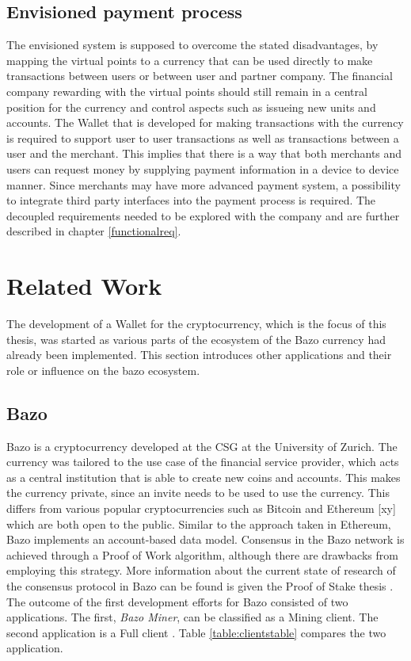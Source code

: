 \subsection{Envisioned payment process}
The envisioned system is supposed to overcome the stated disadvantages, by mapping the virtual points to a currency that can be used directly to make transactions between users or between user and partner company.
The financial company rewarding with the virtual points should still remain in a central position for the currency and control aspects such as issueing new units and accounts.
The Wallet that is developed for making transactions with the currency is required to support user to user transactions as well as transactions between a user and the merchant. This implies that there is a way that both merchants and users can request money by supplying payment information in a device to device manner. Since merchants may have more advanced payment system, a possibility to integrate third party interfaces into the payment process is required. The decoupled requirements needed to be explored with the company and are further described in chapter \ref{functionalreq}.


\section{Related Work}
The development of a Wallet for the cryptocurrency, which is the focus of this thesis, was started as various parts of the ecosystem of the Bazo currency had already been implemented. This section introduces other applications and their role or influence on the bazo ecosystem.
\subsection{Bazo}
Bazo is a cryptocurrency developed at the CSG at the University of Zurich. The currency was tailored to the use case of the financial service provider, which acts as a central institution that is able to create new coins and accounts. This makes the currency private, since an invite needs to be used to use the currency. This differs from various popular cryptocurrencies such as Bitcoin and Ethereum [xy] which are both open to the public. Similar to the approach taken in Ethereum, Bazo implements an account-based data model. Consensus in the Bazo network is achieved through a Proof of Work algorithm, although there are drawbacks from employing this strategy. More information about the current state of research of the consensus protocol in Bazo can be found is given the Proof of Stake thesis \cite{proofofstake}.
The outcome of the first development efforts for Bazo consisted of two applications. The first, \textit{Bazo Miner}, can be classified as a Mining client. The second application is a Full client \cite{bitcoinclients}. Table \ref{table:clientstable} compares the two application.
